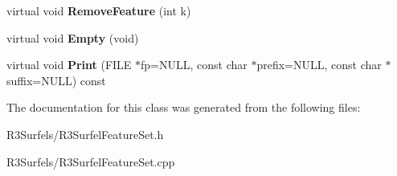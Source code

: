 \begin{DoxyCompactItemize}
\item 
virtual void {\bfseries Remove\+Feature} (int k)\hypertarget{class_r3_surfel_feature_set_a40e3b4d95364a7986217d73a3ce8b481}{}\label{class_r3_surfel_feature_set_a40e3b4d95364a7986217d73a3ce8b481}

\item 
virtual void {\bfseries Empty} (void)\hypertarget{class_r3_surfel_feature_set_a2ba69597c212ee87f04527f06d11db04}{}\label{class_r3_surfel_feature_set_a2ba69597c212ee87f04527f06d11db04}

\item 
virtual void {\bfseries Print} (F\+I\+LE $\ast$fp=N\+U\+LL, const char $\ast$prefix=N\+U\+LL, const char $\ast$suffix=N\+U\+LL) const \hypertarget{class_r3_surfel_feature_set_af33ac7049f518399ecda0d8933160d64}{}\label{class_r3_surfel_feature_set_af33ac7049f518399ecda0d8933160d64}

\end{DoxyCompactItemize}


The documentation for this class was generated from the following files\+:\begin{DoxyCompactItemize}
\item 
R3\+Surfels/R3\+Surfel\+Feature\+Set.\+h\item 
R3\+Surfels/R3\+Surfel\+Feature\+Set.\+cpp\end{DoxyCompactItemize}
